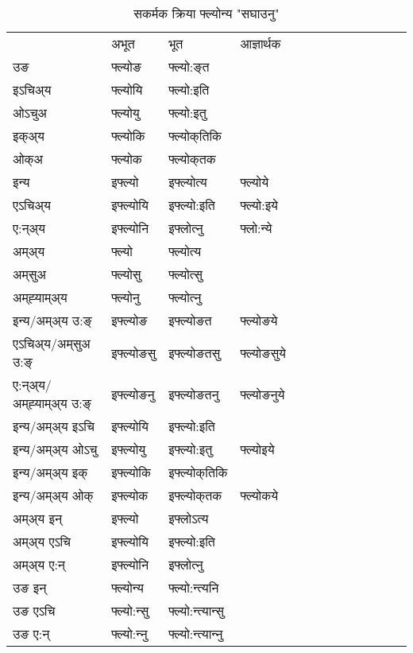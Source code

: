 \begin{table}[H]
\centering
\caption{\label{o.vt} सकर्मक क्रिया  फ्ल्योन्य  "सघाउनु"  }
\begin{tabular}{l|l|l|l|l|l|l|l|l|l|l|l|l}  \toprule
&अभूत & भूत & आज्ञार्थक \\ 
उङ &फ्ल्योङ &फ्ल्यो:ङ्‌त \\ 
इऽचिअ्य &फ्ल्योयि &फ्ल्यो:इति   \\ 
ओऽचुअ &फ्ल्योयु &फ्ल्यो:इतु   \\ 
इक्अ्य &फ्ल्योकि &फ्ल्योक्‌तिकि   \\ 
ओक्अ &फ्ल्योक &फ्ल्योक्‌तक   \\ 
इन्य & इफ्ल्यो & इफ्ल्योत्य &फ्ल्योये  \\ 
एऽचिअ्य & इफ्ल्योयि & इफ्ल्यो:इति &फ्ल्यो:इये    \\ 
ए:न्अ्य & इफ्ल्योनि  & इफ्लोत्‍नु &फ्लो:न्ये  \\ 
अम्अ्य & फ्ल्यो & फ्ल्योत्य   \\ 
अम्‌सुअ & फ्ल्योसु & फ्ल्योत्सु     \\ 
अम्‌ह्‍याम्अ्य & फ्ल्योनु  & फ्ल्योत्‍नु \\ 
\midrule
इन्य/अम्अ्य उ:ङ्‌&इफ्ल्योङ &इफ्ल्योङत &फ्ल्योङये \\ 
एऽचिअ्य/अम्‌सुअ उ:ङ्‌ &इफ्ल्योङसु &इफ्ल्योङतसु &फ्ल्योङसुये \\ 
ए:न्अ्य/अम्‌ह्‍याम्अ्य उ:ङ्‌ &इफ्ल्योङनु &इफ्ल्योङतनु &फ्ल्योङनुये \\ 
इन्य/अम्अ्य इऽचि &इफ्ल्योयि &इफ्ल्यो:इति    \\ 
इन्य/अम्अ्य ओऽचु &इफ्ल्योयु &इफ्ल्यो:इतु  &फ्ल्योइये  \\ 
इन्य/अम्अ्य इक् &इफ्ल्योकि &इफ्ल्योक्‌तिकि   \\ 
इन्य/अम्अ्य ओक् &इफ्ल्योक &इफ्ल्योक्‌तक  &फ्ल्योकये  \\ 
अम्अ्य इन् & इफ्ल्यो & इफ्लोऽत्य   \\ 
अम्अ्य एऽचि & इफ्ल्योयि & इफ्ल्यो:इति     \\ 
अम्अ्य ए:न् & इफ्ल्योनि  & इफ्लोत्‍नु  \\ 
\midrule
उङ इन् & फ्ल्योन्य  & फ्ल्यो:न्त्यनि  \\ 
उङ एऽचि & फ्ल्यो:न्सु  & फ्ल्यो:न्त्यान्सु   \\ 
उङ ए:न्& फ्ल्यो:न्‍नु  & फ्ल्यो:न्त्यान्‍नु   \\ 
\bottomrule
\end{tabular}
\end{table}


